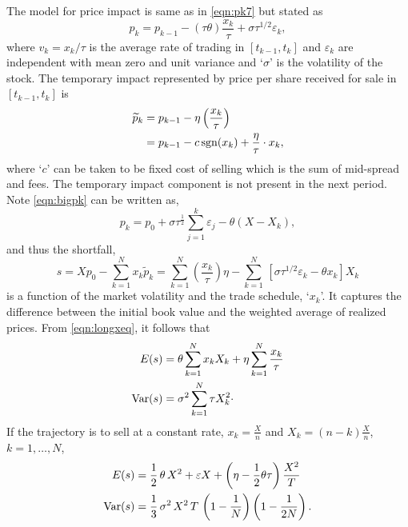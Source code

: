 The model for price impact is same as in \eqref{eqn:pk7} but stated as
	\begin{equation} \label{eqn:bigpk}
	p_k= p_{k-1} - (\tau\theta)\dfrac{x_k}{\tau} + \sigma \tau^{1/2}\varepsilon_k,
	\end{equation}
where $v_k = x_k / \tau$ is the average rate of trading in $[t_{k-1}, t_k]$ and $\varepsilon_k$ are independent with mean zero and unit variance and `$\sigma$' is the volatility of the stock. The temporary impact represented by price per share received for sale in $[t_{k-1}, t_k]$ is
	\begin{equation} \label{eqn:pdouble}
	\begin{aligned}
	\widetilde{p}_k &= p_{k-1} - \eta\left( \dfrac{x_k}{\tau} \right) \\
			&= p_{k-1} - c \sgn(x_k) + \frac{\eta}{\tau} \cdot x_k,
	\end{aligned}
	\end{equation}
where `$c$' can be taken to be fixed cost of selling which is the sum of mid-spread and fees. The temporary impact component is not present in the next period. Note \eqref{eqn:bigpk} can be written as,
	\begin{equation} \label{eqn:morepk}
	p_k = p_0 + \sigma\tau^{\frac{1}{2}}\sum_{j=1}^k\varepsilon_j - \theta(X - X_k),
	\end{equation}
and thus the shortfall,
	\begin{equation} \label{eqn:longxeq}
	s = Xp_0 - \sum_{k=1}^N x_k\widetilde{p}_k = \sum_{k=1}^N \left(\frac{x_k}{\tau}\right) \eta - \sum_{k=1}^N \,[\sigma\tau^{1/2}\varepsilon_k - \theta x_k]X_k
	\end{equation}
is a function of the market volatility and the trade schedule, `$x_k$'. It captures the difference between the initial book value and the weighted average of realized prices. From \eqref{eqn:longxeq}, it follows that
	\begin{equation} \label{eqn:evardouble}
	\begin{aligned}
	E(s) &=  \theta\sum_{k=1}^N x_k X_k + \eta \sum_{k=1}^N \frac{x_k}{\tau} \\
	\var(s) &= \sigma^2 \sum_{k=1}^N \tau X_{k}^2\cdot
	\end{aligned}
	\end{equation}
If the trajectory is to sell at a constant rate, $x_k = \frac{X}{n}$ and $X_k = (n - k) \frac{X}{n}$, $k = 1, \ldots, N$,
	\begin{equation} \label{eqn:secondevardouble}
	\begin{aligned}
	E(s)&= \frac{1}{2}\, \theta\, X^2 + \varepsilon X + \left(\eta - \frac{1}{2} \theta \tau \right) \frac{X^2}{T} \\
	\var(s)&= \frac{1}{3}\, \sigma^2\, X^2\, T\, \left(1 - \frac{1}{N}\right)\left( 1 - \frac{1}{2N} \right).
	\end{aligned}
	\end{equation}

